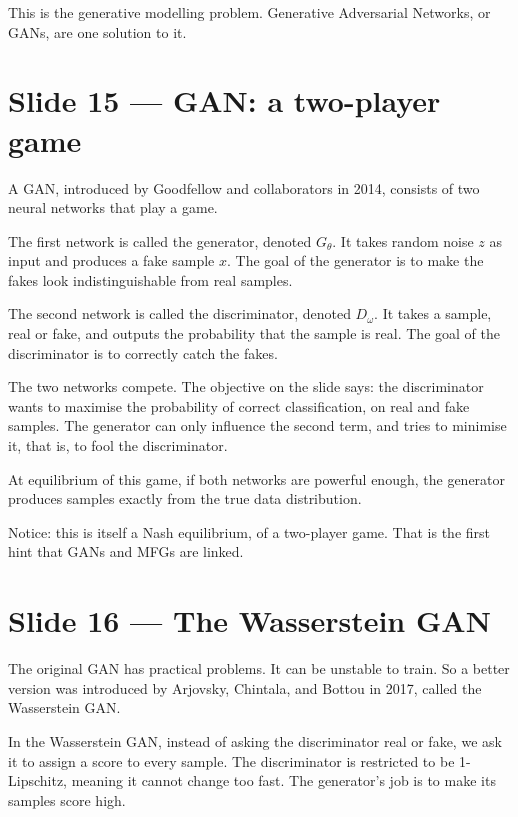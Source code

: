 \documentclass[11pt]{article}
\begin{document}
This is the generative modelling problem. Generative Adversarial Networks,
or GANs, are one solution to it.

\section*{Slide 15 --- GAN: a two-player game}

A GAN, introduced by Goodfellow and collaborators in 2014, consists of two
neural networks that play a game.

The first network is called the generator, denoted $G_\theta$. It takes
random noise $z$ as input and produces a fake sample $x$. The goal of the
generator is to make the fakes look indistinguishable from real samples.

The second network is called the discriminator, denoted $D_\omega$. It takes
a sample, real or fake, and outputs the probability that the sample is real.
The goal of the discriminator is to correctly catch the fakes.

The two networks compete. The objective on the slide says: the discriminator
wants to maximise the probability of correct classification, on real and
fake samples. The generator can only influence the second term, and tries
to minimise it, that is, to fool the discriminator.

At equilibrium of this game, if both networks are powerful enough, the
generator produces samples exactly from the true data distribution.

Notice: this is itself a Nash equilibrium, of a two-player game. That is the
first hint that GANs and MFGs are linked.

\section*{Slide 16 --- The Wasserstein GAN}

The original GAN has practical problems. It can be unstable to train. So a
better version was introduced by Arjovsky, Chintala, and Bottou in 2017,
called the Wasserstein GAN.

In the Wasserstein GAN, instead of asking the discriminator real or fake,
we ask it to assign a score to every sample. The discriminator is restricted
to be 1-Lipschitz, meaning it cannot change too fast. The generator's job
is to make its samples score high.
\end{document}
